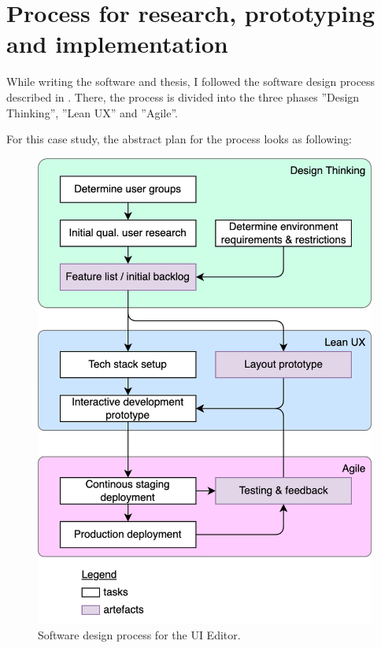 \newpage
\section{Process for research, prototyping and implementation}

While writing the software and thesis, I followed the software design process described in \cite[p. 104]{LearnHCI:2020ys}.
There, the process is divided into the three phases ''Design Thinking'', ''Lean UX'' and ''Agile''.

For this case study, the abstract plan for the process looks as following:
\begin{figure}[h]
  \includegraphics[width=0.8\linewidth]{pics/process.drawio.png}
  \caption{Software design process for the UI Editor.}
	\label{fig:process}
\end{figure}

